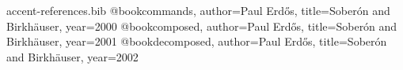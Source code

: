 \begin{filecontents*}{accent-references.bib}
@book{commands,
  author={Paul Erd{\H{o}}s},
  title={{Sober\'{o}n and Birkh\"{a}user}}, year={2000}}
@book{composed,
  author={Paul Erdős},
  title={{Soberón and Birkhäuser}}, year={2001}}
@book{decomposed,
  author={Paul Erdős},
  title={{Soberón and Birkhäuser}}, year={2002}}
\end{filecontents*}
